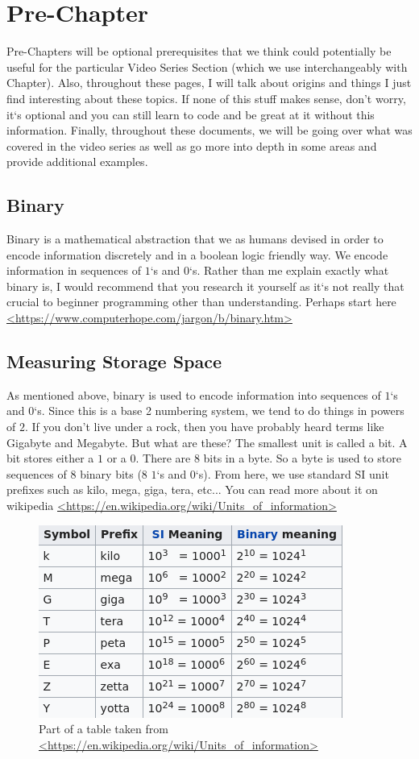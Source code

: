 \documentclass[11]{article}
\begin{document}
\section{Pre-Chapter}
Pre-Chapters will be optional prerequisites that we think could potentially be useful for the particular Video Series Section (which we use interchangeably with Chapter). Also, throughout these pages, I will talk about origins and things I just find interesting about these topics. If none of this stuff makes sense, don't worry, it`s optional and you can still learn to code and be great at it without this information. Finally, throughout these documents, we will be going over what was covered in the video series as well as go more into depth in some areas and provide additional examples.

\subsection{Binary}
Binary is a mathematical abstraction that we as humans devised in order to encode information discretely and in a boolean logic friendly way. We encode information in sequences of $1$`s and $0$`s. Rather than me explain exactly what binary is, I would recommend that you research it yourself as it`s not really that crucial to beginner programming other than understanding. Perhaps start here \url{<https://www.computerhope.com/jargon/b/binary.htm>}

\subsection{Measuring Storage Space}
As mentioned above, binary is used to encode information into sequences of $1$`s and $0$`s. Since this is a base 2 numbering system, we tend to do things in powers of $2$. If you don't live under a rock, then you have probably heard terms like Gigabyte and Megabyte. But what are these? The smallest unit is called a bit. A bit stores either a $1$ or a $0$. There are 8 bits in a byte. So a byte is used to store sequences of 8 binary bits (8 $1$`s and $0$`s). From here, we use standard SI unit prefixes such as kilo, mega, giga, tera, etc... You can read more about it on wikipedia \url{<https://en.wikipedia.org/wiki/Units_of_information>}\\

\begin{figure}[H]
	\centering
	\includegraphics[scale=0.75]{sizes.png}
	\caption{Part of a table taken from \url{<https://en.wikipedia.org/wiki/Units_of_information>}}
\end{figure}
\end{document}

